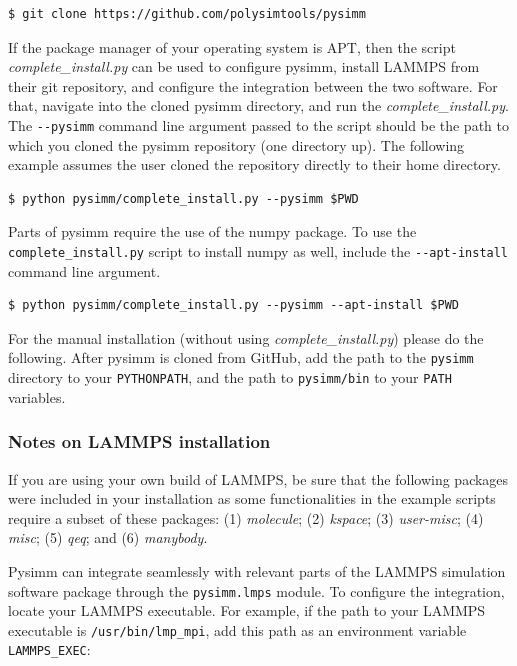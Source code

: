 \documentclass[9pt,tutorial]{livecoms}
\begin{document}
\begin{lstlisting}
$ git clone https://github.com/polysimtools/pysimm
\end{lstlisting}

If the package manager of your operating system is APT, then the script \textit{complete\_install.py} can be used to configure pysimm, install LAMMPS from their git repository, and configure the integration between the two software. For that, navigate into the cloned pysimm directory, and run the \textit{complete\_install.py}. The \lstinline$--pysimm$ command line argument passed to the script should be the path to which you cloned the pysimm repository (one directory up). The following example assumes the user cloned the repository directly to their home directory.

\begin{lstlisting}
$ python pysimm/complete_install.py --pysimm $PWD
\end{lstlisting}

Parts of pysimm require the use of the numpy package. To use the \lstinline$complete_install.py$ script to install numpy as well, include the \lstinline$--apt-install$ command line argument.

\begin{lstlisting}
$ python pysimm/complete_install.py --pysimm --apt-install $PWD
\end{lstlisting}

For the manual installation (without using \textit{complete\_install.py}) please do the following. 
After pysimm is cloned from GitHub, add the path to the \lstinline$pysimm$ directory to your \lstinline$PYTHONPATH$, and the  path to \lstinline$pysimm/bin$ to your \lstinline$PATH$ variables. 


\subsubsection{Notes on LAMMPS installation}

If you are using your own build of LAMMPS, be sure that the following packages were included in your installation as some functionalities in the example scripts require a subset of these packages:
(1) \textit{molecule}; (2) \textit{kspace}; (3) \textit{user-misc}; (4) \textit{misc}; (5) \textit{qeq}; and (6) \textit{manybody}.

Pysimm can integrate seamlessly with relevant parts of the LAMMPS simulation software package through the \lstinline$pysimm.lmps$ module. To configure the integration, locate your LAMMPS executable. For example, if the path to your LAMMPS executable is \lstinline$/usr/bin/lmp_mpi$, add this path as an environment variable \lstinline$LAMMPS_EXEC$:
\end{document}
